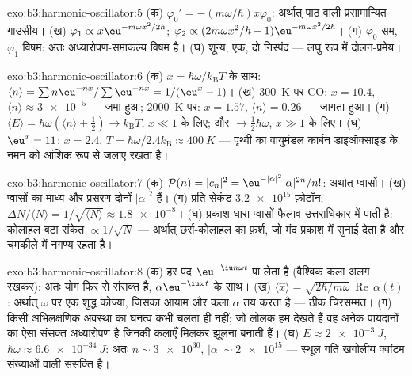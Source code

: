\begin{solution}{exo:b3:harmonic-oscillator:5}
(क) $\varphi_0' = -(m\omega/\hbar)x\varphi_0$: अर्थात् पाठ वाली
प्रसामान्यित गाउसीय। (ख) $\varphi_1 \propto x\eu^{-m\omega
x^2/2\hbar}$; $\varphi_2 \propto (2m\omega x^2/\hbar -
1)\eu^{-m\omega x^2/2\hbar}$। (ग) $\varphi_0$ सम, $\varphi_1$ विषम:
अतः अध्यारोपण-समाकल्य विषम है। (घ) शून्य, एक, दो निस्पंद --- लघु रूप
में दोलन-प्रमेय।
\end{solution}

\begin{solution}{exo:b3:harmonic-oscillator:6}
(क) $x = \hbar\omega/k_{\text{B}}T$ के साथ: $\langle n\rangle =
\sum n\eu^{-nx}/\sum\eu^{-nx} = 1/(\eu^x - 1)$। (ख) \qty{300}{K} पर CO:
$x = 10.4$, $\langle n\rangle \approx \num{3e-5}$ ---
जमा हुआ; \qty{2000}{K} पर: $x = 1.57$, $\langle n\rangle = 0.26$ ---
जागता हुआ। (ग) $\langle E\rangle = \hbar\omega(\langle n\rangle +
\tfrac12) \to k_{\text{B}}T$, $x \ll 1$ के लिए; और $\to \tfrac12\hbar
\omega$, $x \gg 1$ के लिए। (घ) $\eu^x = 11$: $x = 2.4$, $T =
\hbar\omega/2.4k_{\text{B}} \approx \qty{400}{K}$ --- पृथ्वी का
वायुमंडल कार्बन डाइऑक्साइड के नमन को आंशिक रूप से जलाए रखता है।
\end{solution}

\begin{solution}{exo:b3:harmonic-oscillator:7}
(क) $\mathcal P(n) = |c_n|^2 = \eu^{-|\alpha|^2}|\alpha|^{2n}/n!$:
अर्थात् प्वासों। (ख) प्वासों का माध्य और प्रसरण दोनों $|\alpha|^2$ हैं।
(ग) प्रति सेकंड $\num{3.2e15}$ फ़ोटॉन; $\Delta N/\langle N\rangle =
1/\sqrt{\langle N\rangle} \approx \num{1.8e-8}$। (घ)
प्रकाश-धारा प्वासों फैलाव उत्तराधिकार में पाती है: कोलाहल बटा संकेत
$\propto 1/\sqrt N$ --- अर्थात् छर्रा-कोलाहल का फ़र्श, जो मंद
प्रकाश में सुनाई देता है और चमकीले में नगण्य रहता है।
\end{solution}

\begin{solution}{exo:b3:harmonic-oscillator:8}
(क) हर पद $\eu^{-\iu n\omega t}$ पा लेता है (वैश्विक कला अलग रखकर):
अतः योग फिर से संसक्त है, $\alpha\eu^{-\iu\omega t}$ के साथ। (ख)
$\langle\hat x\rangle = \sqrt{2\hbar/m\omega}\,
\operatorname{Re}\,\alpha(t)$: अर्थात् $\omega$ पर एक शुद्ध कोज्या,
जिसका आयाम और कला $\alpha$ तय करता है --- ठीक चिरसम्मत। (ग) किसी
अभिलक्षणिक अवस्था का घनत्व कभी चलता ही नहीं; जो लोलक हम देखते हैं वह
अनेक पायदानों का ऐसा संसक्त अध्यारोपण है जिनकी कलाएँ मिलकर झूलना बनाती
हैं। (घ) $E
\approx \qty{2e-3}{J}$, $\hbar\omega \approx \qty{6.6e-34}{J}$: अतः $n
\sim \num{3e30}$, $|\alpha| \sim \num{2e15}$ --- स्थूल गति
खगोलीय क्वांटम संख्याओं वाली संसक्ति है।
\end{solution}

